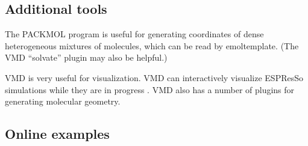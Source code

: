 \documentclass[11pt]{article}
\begin{document}

\subsection*{Additional tools}


  The PACKMOL \cite{packmol} program is useful for generating 
coordinates of dense heterogeneous mixtures of molecules,
which can be read by emoltemplate.
(The VMD ``solvate'' plugin may also be helpful.)

  VMD \cite{VMD} is very useful for visualization. 
VMD can interactively visualize ESPResSo simulations while 
they are in progress \cite{VMDIMD}.
VMD also has a number of plugins for generating molecular geometry.


\subsection*{Online examples}
\end{document}
